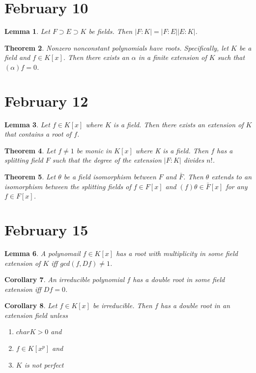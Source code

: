 \documentclass[letterpaper]{article}
\newtheorem{theorem}{Theorem}[section]
\newtheorem{lemma}[theorem]{Lemma}
\newtheorem{corollary}[theorem]{Corollary}
\begin{document}
\section{February 10}

\begin{lemma}
Let $F \supset E \supset K$ be fields. Then $|F \colon K| = |F \colon E||E \colon K|$.
\end{lemma}

\begin{theorem}
Nonzero nonconstant polynomials have roots. Specifically, let $K$ be a field and $f \in K[x]$. Then there exists an $\alpha$ in a finite extension of $K$ such that $(\alpha)f = 0$.
\end{theorem}

\section{February 12}

\begin{lemma}
Let $f \in K[x]$ where $K$ is a field.  Then there exists an extension of $K$ that contains a root of $f$.
\end{lemma}

\begin{theorem}
Let $f \neq 1$ be monic in $K[x]$ where K is a field.  Then $f$ has a splitting field $F$ such that the degree of the extension $|F \colon K|$  divides $n!$.
\end{theorem}

\begin{theorem}
Let $\theta$ be a field isomorphism between $F$ and $\bar{F}$. Then $\theta$ extends to an isomorphism between the splitting fields of $f \in F[x]$ and $(f) \theta \in \bar{F}[x]$ for any $f \in F[x]$.
\end{theorem}

\section{February 15}

\begin{lemma}
A polynomail $f \in K[x]$ has a root with multiplicity in some field extension of $K$ iff $gcd(f, Df) \ne 1$.
\end{lemma}

\begin{corollary}
An irreducible polynomial $f$ has a double root in some field extension iff $Df = 0$.
\end{corollary}

\begin{corollary}
Let $f \in K[x]$ be irreducible. Then $f$ has a double root in an extension field unless
\begin{enumerate}
\item $char K > 0$ and
\item $f \in K[x^p]$ and
\item $K$ is not perfect
\end{enumerate}
\end{corollary}
\end{document}
